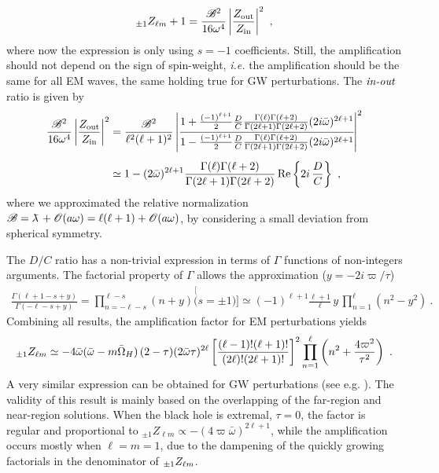 \begin{align}
    \label{eq3:amplificationBAoutAin}
    \uu[\pm1]{Z}{\ell m} +1 = \frac{\mathscr{B}^2}{16 \omega^4} \left| \frac{Z_\mathrm{out}}{Z_\mathrm{in} } \right|^2 ~,
\end{align}
where now the expression is only using $s=-1$ coefficients.
Still, the amplification should not depend on the sign of spin-weight, \emph{i.e.} the amplification should be the same for all EM waves, the same holding true for GW perturbations.
The $\emph{in-out}$ ratio is given by
\begin{align}
    \begin{split}
        \frac{\mathscr{B}^2}{16 \omega^4} \left| \frac{Z_\mathrm{out}}{Z_\mathrm{in} } \right|^2 &= 
        \frac{\mathscr{B}^2}{\ell^2(\ell+1)^2} 
        \left|\cfrac{ 
            1+ \frac{(-1)^{\ell+1}}{2} \frac{D}{C} 
            \frac{\Gamma(\ell) \Gamma(\ell+2)}{\Gamma(2\ell+1) \Gamma(2\ell+2)} 
            (2 i\bar{\omega})^{2\ell+1}
            }{
            1 - \frac{(-1)^{\ell+1}}{2} \frac{D}{C}
            \frac{\Gamma(\ell) \Gamma(\ell+2)}{\Gamma(2\ell+1) \Gamma(2\ell+2)}
            (2 i\bar{\omega})^{2\ell+1}
        }\right|^2 \\[0.15cm]
        & \simeq  1 - (2 \bar{\omega})^{2\ell+1}
        \frac{\Gamma(\ell) \Gamma(\ell+2)}{\Gamma(2\ell+1) \Gamma(2\ell+2)} \,\Re\left\{2 i \,\frac{D}{C}\right\} ~,
    \end{split}
\end{align}
where we approximated the relative normalization $\mathscr{B} = \lambdabar + \mathscr{O}(a\omega) = \ell(\ell+1) + \mathscr{O}(a\omega)$, by considering a small deviation from spherical symmetry.

The $D/C$ ratio has a non-trivial expression in terms of $\Gamma$ functions of non-integers arguments. The factorial property of $\Gamma$ allows the approximation ($y = - 2 i \varpi/\tau$)
\begin{align}
    \frac{\Gamma(\ell+1-s + y)}{\Gamma(-\ell - s + y)} = \prod_{n=-\ell-s}^{\ell-s} (n + y) \stackrel[(s=\pm 1)]{}{\simeq} (-1)^{\ell+1} \frac{\ell+1}{\ell} \, y \,\prod_{n=1}^{\ell} (n^2 - y^2) ~.
\end{align}
Combining all results, the amplification factor for EM perturbations yields
\begin{align}
    \label{eq3:ZfactorEM}
    \uu[\pm1]{Z}{\ell m} \simeq  - 4 \bar{\omega} (\bar{\omega} - m \bar{\Omega}_H) \,(2-\tau)(2\bar{\omega} \tau)^{2\ell} \left[\frac{(\ell-1)! (\ell+1)!}{(2\ell)! (2\ell+1)!}\right]^2 \prod_{n=1}^{\ell} \left(n^2 + \frac{4 \varpi^2}{\tau^2} \right) ~.
\end{align}
A very similar expression can be obtained for GW perturbations (see e.g. \cite{Rosa2016}).
The validity of this result is mainly based on the overlapping of the far-region and near-region solutions.
When the black hole is extremal, $\tau=0$, the factor is regular and proportional to ${}_{\pm1}Z_{\ell m}\propto - (4 \varpi \bar{\omega})^{2\ell+1}$, while the amplification occurs mostly when $\ell=m=1$, due to the dampening of the quickly growing factorials in the denominator of $\uu[\pm1]{Z}{\ell m}$.

